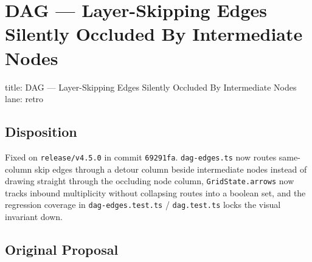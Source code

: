 \chapter{DAG --- Layer-Skipping Edges Silently Occluded By Intermediate Nodes}\label{record-289}

\smallskip

\begin{RecordMeta}
title: DAG — Layer-Skipping Edges Silently Occluded By Intermediate Nodes
lane: retro

\end{RecordMeta}

\section{Disposition}\label{record-289-disposition}

Fixed on \texttt{r\allowbreak{}e\allowbreak{}l\allowbreak{}e\allowbreak{}a\allowbreak{}s\allowbreak{}e\allowbreak{}/\allowbreak{}v\allowbreak{}4\allowbreak{}.\allowbreak{}5\allowbreak{}.\allowbreak{}0} in commit \texttt{6\allowbreak{}9\allowbreak{}2\allowbreak{}9\allowbreak{}1\allowbreak{}f\allowbreak{}a}. \texttt{d\allowbreak{}a\allowbreak{}g\allowbreak{}-\allowbreak{}e\allowbreak{}d\allowbreak{}g\allowbreak{}e\allowbreak{}s\allowbreak{}.\allowbreak{}t\allowbreak{}s} now routes same-column skip edges through a detour column beside intermediate nodes instead of drawing straight through the occluding node column, \texttt{G\allowbreak{}r\allowbreak{}i\allowbreak{}d\allowbreak{}S\allowbreak{}t\allowbreak{}a\allowbreak{}t\allowbreak{}e\allowbreak{}.\allowbreak{}a\allowbreak{}r\allowbreak{}r\allowbreak{}o\allowbreak{}w\allowbreak{}s} now tracks inbound multiplicity without collapsing routes into a boolean set, and the regression coverage in \texttt{d\allowbreak{}a\allowbreak{}g\allowbreak{}-\allowbreak{}e\allowbreak{}d\allowbreak{}g\allowbreak{}e\allowbreak{}s\allowbreak{}.\allowbreak{}t\allowbreak{}e\allowbreak{}s\allowbreak{}t\allowbreak{}.\allowbreak{}t\allowbreak{}s} / \texttt{d\allowbreak{}a\allowbreak{}g\allowbreak{}.\allowbreak{}t\allowbreak{}e\allowbreak{}s\allowbreak{}t\allowbreak{}.\allowbreak{}t\allowbreak{}s} locks the visual invariant down.

\section{Original Proposal}\label{record-289-original-proposal}

